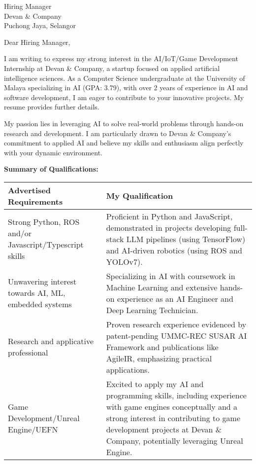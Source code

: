 \documentclass[10.5pt]{letter}
\date{\today}
\begin{document}
\begin{letter}{Hiring Manager\\
Devan \& Company\\
Puchong Jaya, Selangor}

\opening{Dear Hiring Manager,}

I am writing to express my strong interest in the AI/IoT/Game Development Internship at Devan \& Company, a startup focused on applied artificial intelligence sciences. As a Computer Science undergraduate at the University of Malaya specializing in AI (GPA: 3.79), with over 2 years of experience in AI and software development, I am eager to contribute to your innovative projects. My resume provides further details.

My passion lies in leveraging AI to solve real-world problems through hands-on research and development. I am particularly drawn to Devan \& Company's commitment to applied AI and believe my skills and enthusiasm align perfectly with your dynamic environment.

\vspace{0.3cm}
\textbf{Summary of Qualifications:}
\vspace{0.2cm}

\renewcommand{\arraystretch}{1.3}
\begin{tabularx}{\textwidth}{@{}p{}X@{}}
\textbf{Advertised Requirements} & \textbf{My Qualification} \\

\hline
Strong Python, ROS and/or Javascript/Typescript skills & Proficient in Python and JavaScript, demonstrated in projects developing full-stack LLM pipelines (using TensorFlow) and AI-driven robotics (using ROS and YOLOv7). \\

Unwavering interest towards AI, ML, embedded systems & Specializing in AI with coursework in Machine Learning and extensive hands-on experience as an AI Engineer and Deep Learning Technician. \\

Research and applicative professional & Proven research experience evidenced by patent-pending UMMC-REC SUSAR AI Framework and publications like AgileIR, emphasizing practical applications. \\

Game Development/Unreal Engine/UEFN &  Excited to apply my AI and programming skills, including experience with game engines conceptually and a strong interest in contributing to game development projects at Devan \& Company, potentially leveraging Unreal Engine.  \\


\end{tabularx}
\end{letter}
\end{document}
